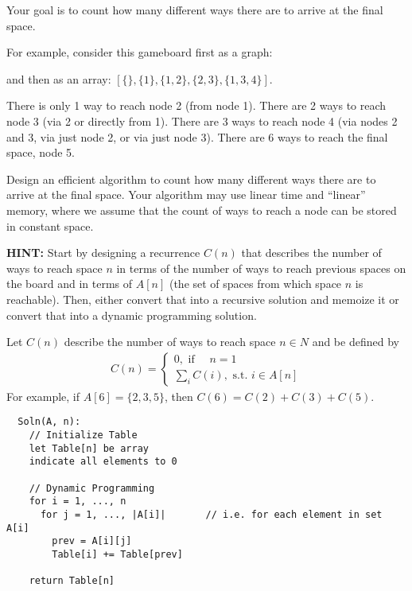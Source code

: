 \documentclass[11pt, oneside]{article}   	%
\theoremstyle{definition}
\theoremstyle{remark}
\begin{document}
Your goal is to count how many different ways there are to arrive at
the final space.

For example, consider this gameboard first as a graph:


and then as an array: $[\{\}, \{1\}, \{1,2\}, \{2,3\}, \{1,3,4\}]$.

There is only 1 way to reach node 2 (from node 1). There are 2 ways to
reach node 3 (via 2 or directly from 1). There are 3 ways to reach
node 4 (via nodes 2 and 3, via just node 2, or via just node 3). There
are 6 ways to reach the final space, node 5.

Design an efficient algorithm to count how many different ways there
are to arrive at the final space. Your algorithm may use linear time
and ``linear'' memory, where we assume that the count of ways to reach a
node can be stored in constant space.

\textbf{HINT:} Start by designing a recurrence $C(n)$ that describes the
number of ways to reach space $n$ in terms of the number of ways to
reach previous spaces on the board and in terms of $A[n]$ (the set of
spaces from which space $n$ is reachable). Then, either convert that
into a recursive solution and memoize it or convert that into a
dynamic programming solution.

Let $C(n)$ describe the number of ways to reach space $n\in {N}$ and be defined by
\begin{align*}
	C(n) = \begin{cases}
		0, \text{ if } \quad n=1\\
		\sum_i C(i), \text{ s.t. } i \in A[n]
	\end{cases}
\end{align*}
For example, if $A[6] = \{2, 3, 5\}$, then $C(6)=C(2)+C(3)+C(5)$.
\begin{verbatim}
  Soln(A, n):
    // Initialize Table
    let Table[n] be array
    indicate all elements to 0
    
    // Dynamic Programming
    for i = 1, ..., n
      for j = 1, ..., |A[i]|       // i.e. for each element in set A[i]
        prev = A[i][j]
        Table[i] += Table[prev]
    
    return Table[n]
\end{verbatim}
\end{document}
